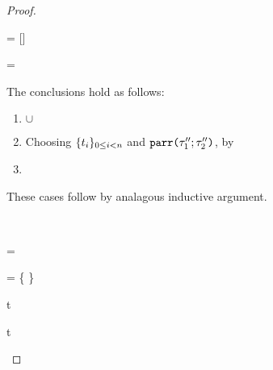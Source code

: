 \begin{proof}
\begin{byCases}
\begin{pfsteps}
    \item {} = [] 
    \item {} =  \cup {}  
    \item {} \subset \domof{\Delta} \cup {}  
    \end{pfsteps}
    The conclusions hold as follows:
    \begin{enumerate}
      \item {} $\cup$ 
      \item Choosing $\{t_i\}_{0 \leq i < n}$ and $\texttt{parr}\texttt{(}\tau''_1; \tau''_2\texttt{)}$, by 
      \item {}
    \end{enumerate}
    \resetpfcounter
  \item[\text{(\ref{rule:cvalidT-U-all}) \textbf{through} (\ref{rule:cvalidT-U-sum})}] These cases follow by analagous inductive argument.
  \item[\text{(\ref{rule:cvalidT-U-splicedt})}] ~
  \begin{pfsteps}
  \item \ctau =  
  \item {} = \{  \} 
  \item {}  
  \item {}  
  \item t \notin \domof{\Delta}  
  \item t \notin {}  

\end{pfsteps}
\end{byCases}
\end{proof}
